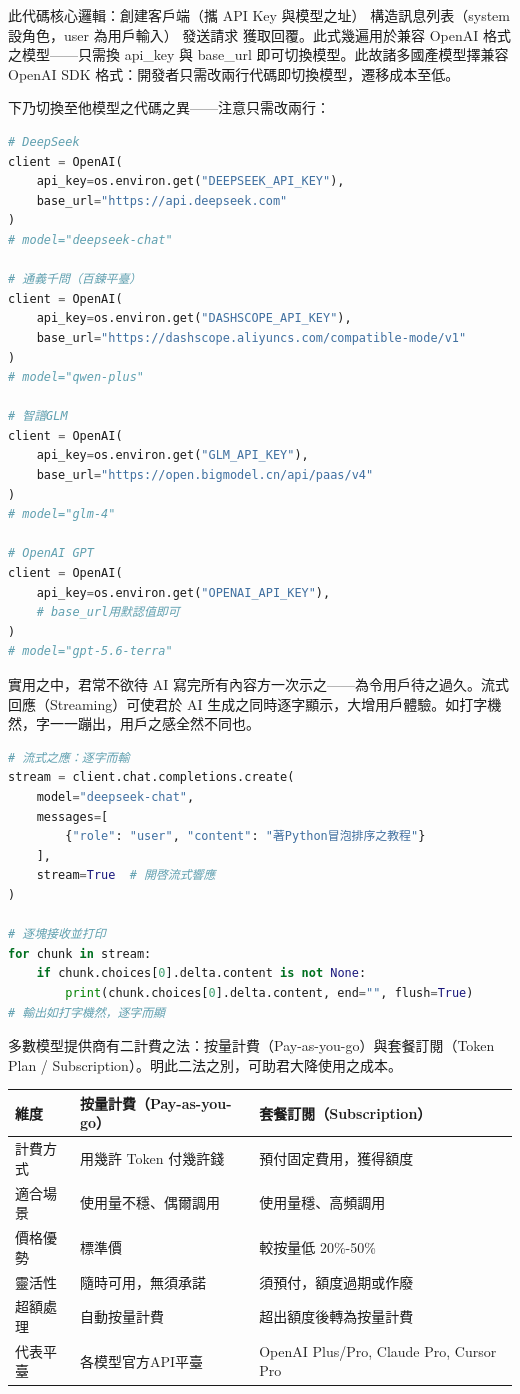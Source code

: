 此代碼核心邏輯：創建客戶端（攜 API Key 與模型之址） 構造訊息列表（system 設角色，user 為用戶輸入） 發送請求 獲取回覆。此式幾遍用於兼容 OpenAI 格式之模型——只需換 api\_key 與 base\_url 即可切換模型。此故諸多國產模型擇兼容 OpenAI SDK 格式：開發者只需改兩行代碼即切換模型，遷移成本至低。

下乃切換至他模型之代碼之異——注意只需改兩行：

\begin{lstlisting}[language=Python]
# DeepSeek
client = OpenAI(
    api_key=os.environ.get("DEEPSEEK_API_KEY"),
    base_url="https://api.deepseek.com"
)
# model="deepseek-chat"

# 通義千問（百鍊平臺）
client = OpenAI(
    api_key=os.environ.get("DASHSCOPE_API_KEY"),
    base_url="https://dashscope.aliyuncs.com/compatible-mode/v1"
)
# model="qwen-plus"

# 智譜GLM
client = OpenAI(
    api_key=os.environ.get("GLM_API_KEY"),
    base_url="https://open.bigmodel.cn/api/paas/v4"
)
# model="glm-4"

# OpenAI GPT
client = OpenAI(
    api_key=os.environ.get("OPENAI_API_KEY"),
    # base_url用默認值即可
)
# model="gpt-5.6-terra"
\end{lstlisting}


實用之中，君常不欲待 AI 寫完所有內容方一次示之——為令用戶待之過久。流式回應（Streaming）可使君於 AI 生成之同時逐字顯示，大增用戶體驗。如打字機然，字一一蹦出，用戶之感全然不同也。

\begin{lstlisting}[language=Python]
# 流式之應：逐字而輸
stream = client.chat.completions.create(
    model="deepseek-chat",
    messages=[
        {"role": "user", "content": "著Python冒泡排序之教程"}
    ],
    stream=True  # 開啓流式響應
)

# 逐塊接收並打印
for chunk in stream:
    if chunk.choices[0].delta.content is not None:
        print(chunk.choices[0].delta.content, end="", flush=True)
# 輸出如打字機然，逐字而顯
\end{lstlisting}


多數模型提供商有二計費之法：按量計費（Pay-as-you-go）與套餐訂閱（Token Plan / Subscription）。明此二法之別，可助君大降使用之成本。


\begin{center}
\begin{tabularx}{\linewidth}{|X|X|X|}
\hline
\textbf{維度} & \textbf{按量計費（Pay-as-you-go）} & \textbf{套餐訂閱（Subscription）} \tabularnewline
\hline
計費方式 & 用幾許 Token 付幾許錢 & 預付固定費用，獲得額度 \tabularnewline
適合場景 & 使用量不穩、偶爾調用 & 使用量穩、高頻調用 \tabularnewline
價格優勢 & 標準價 & 較按量低 20\%-50\% \tabularnewline
靈活性 & 隨時可用，無須承諾 & 須預付，額度過期或作廢 \tabularnewline
超額處理 & 自動按量計費 & 超出額度後轉為按量計費 \tabularnewline
代表平臺 & 各模型官方API平臺 & OpenAI Plus/Pro, Claude Pro, Cursor Pro \tabularnewline
\hline
\end{tabularx}
\end{center}

